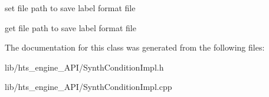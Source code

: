 set file path to save label format file 

get file path to save label format file 

\-The documentation for this class was generated from the following files\-:\begin{DoxyCompactItemize}
\item 
lib/hts\-\_\-engine\-\_\-\-A\-P\-I/\-Synth\-Condition\-Impl.\-h\item 
lib/hts\-\_\-engine\-\_\-\-A\-P\-I/\-Synth\-Condition\-Impl.\-cpp\end{DoxyCompactItemize}
